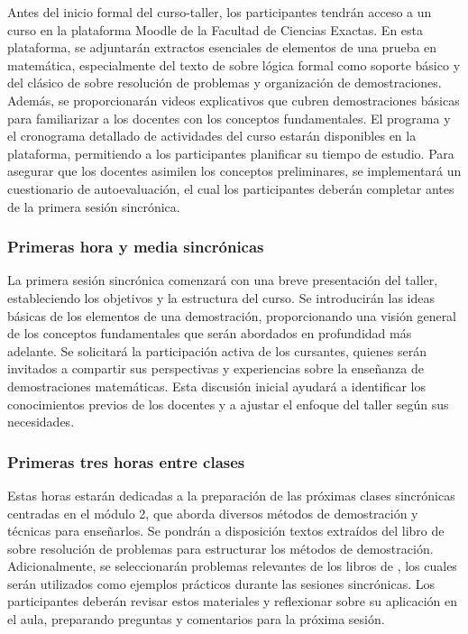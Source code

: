 Antes del inicio formal del curso-taller, los participantes tendrán acceso a un curso en la plataforma Moodle de la Facultad de Ciencias Exactas. En esta plataforma, se adjuntarán extractos esenciales de elementos de una prueba en matemática, especialmente del texto de \textcite{margaris1968} sobre lógica formal como soporte básico y del clásico de \textcite{polya1945} sobre resolución de problemas y organización de demostraciones. Además, se proporcionarán videos explicativos que cubren demostraciones básicas para familiarizar a los docentes con los conceptos fundamentales. El programa y el cronograma detallado de actividades del curso estarán disponibles en la plataforma, permitiendo a los participantes planificar su tiempo de estudio. Para asegurar que los docentes asimilen los conceptos preliminares, se implementará un cuestionario de autoevaluación, el cual los participantes deberán completar antes de la primera sesión sincrónica.

\subsubsection{Primeras hora y media sincrónicas}

La primera sesión sincrónica comenzará con una breve presentación del taller, estableciendo los objetivos y la estructura del curso. Se introducirán las ideas básicas de los elementos de una demostración, proporcionando una visión general de los conceptos fundamentales que serán abordados en profundidad más adelante. Se solicitará la participación activa de los cursantes, quienes serán invitados a compartir sus perspectivas y experiencias sobre la enseñanza de demostraciones matemáticas. Esta discusión inicial ayudará a identificar los conocimientos previos de los docentes y a ajustar el enfoque del taller según sus necesidades.

\subsubsection{Primeras tres horas entre clases}

Estas horas estarán
dedicadas a la preparación de las próximas clases sincrónicas centradas en el módulo 2, que aborda diversos métodos de demostración y técnicas para enseñarlos. Se pondrán a disposición textos extraídos del libro de \textcite{larson1983} sobre resolución de problemas para estructurar los métodos de demostración. Adicionalmente, se seleccionarán problemas relevantes de los libros de \textcite{araujo2020a, araujo2020b, araujo2020c, fauring2000, fauring2023}, los cuales serán utilizados como ejemplos prácticos durante las sesiones sincrónicas. Los participantes deberán revisar estos materiales y reflexionar sobre su aplicación en el aula, preparando preguntas y comentarios para la próxima sesión.

